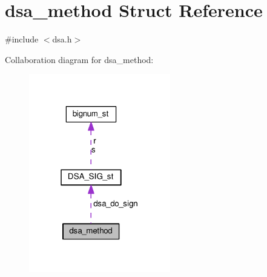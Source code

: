 \hypertarget{structdsa__method}{}\section{dsa\+\_\+method Struct Reference}
\label{structdsa__method}


{\ttfamily \#include $<$dsa.\+h$>$}



Collaboration diagram for dsa\+\_\+method\+:
\nopagebreak
\begin{figure}[H]
\begin{center}
\leavevmode
\includegraphics[width=175pt]{structdsa__method__coll__graph}
\end{center}
\end{figure}
